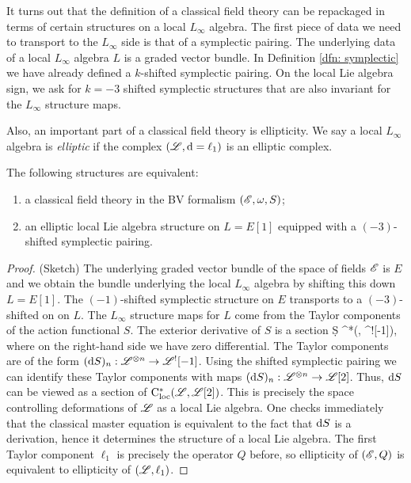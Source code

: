 \documentclass[11pt]{amsart}
\begin{document}
It turns out that the definition of a classical field theory can be repackaged in terms of certain structures on a local $L_\infty$ algebra.
The first piece of data we need to transport to the $L_\infty$ side is that of a symplectic pairing. 
The underlying data of a local $L_\infty$ algebra $L$ is a graded vector bundle. 
In Definition \ref{dfn: symplectic} we have already defined a $k$-shifted symplectic pairing. 
On the local Lie algebra sign, we ask for $k=-3$ shifted symplectic structures that are also invariant for the $L_\infty$ structure maps. 

Also, an important part of a classical field theory is ellipticity. 
We say a local $L_\infty$ algebra is {\em elliptic} if the complex $(\mathscr L, {\rm d} = \ell_1)$ is an elliptic complex.

\begin{prop}
The following structures are equivalent:
\begin{enumerate}
\item a classical field theory in the BV formalism $(\mathscr E, \omega, S)$;
\item an elliptic local Lie algebra structure on $L = E [1]$ equipped with a $(-3)$-shifted symplectic pairing.
\end{enumerate}
\end{prop}

\begin{proof} (Sketch) 
The underlying graded vector bundle of the space of fields $\mathscr E$ is $E$ and we obtain the bundle underlying the local $L_\infty$ algebra by shifting this down $L = E[1]$. 
The $(-1)$-shifted symplectic structure on $E$ transports to a $(-3)$-shifted on on $L$. 
The $L_\infty$ structure maps for $L$ come from the Taylor components of the action functional $S$. 
The exterior derivative of $S$ is a section
\ben
\d S \in \cloc^*(\sL, \sL^![-1]),
\een
where on the right-hand side we have zero differential.
The Taylor components are of the form $({\rm d} S)_n : \mathscr L^{\otimes n} \to \mathscr L^![-1]$. 
Using the shifted symplectic pairing we can identify these Taylor components with maps $({\rm d} S)_n : \mathscr L^{\otimes n} \to \mathscr L[2]$. 
Thus, ${\rm d} S$ can be viewed as a section of ${\rm C}_{\rm loc}^*(\mathscr L, \mathscr L[2])$. 
This is precisely the space controlling deformations of $\mathscr L$ as a local Lie algebra.
One checks immediately that the classical master equation is equivalent to the fact that ${\rm d} S$ is a derivation, hence it determines the structure of a local Lie algebra. 
The first Taylor component $\ell_1$ is precisely the operator $Q$ before, so ellipticity of $(\mathscr E, Q)$ is equivalent to ellipticity of $(\mathscr L, \ell_1)$. 
\end{proof}
\end{document}
